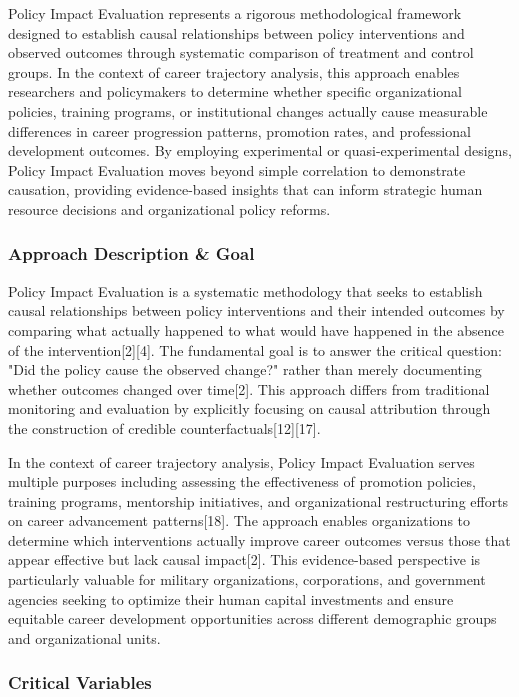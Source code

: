 \documentclass[main.tex]{subfiles}
\begin{document}
Policy Impact Evaluation represents a rigorous methodological framework designed to establish causal relationships between policy interventions and observed outcomes through systematic comparison of treatment and control groups. In the context of career trajectory analysis, this approach enables researchers and policymakers to determine whether specific organizational policies, training programs, or institutional changes actually cause measurable differences in career progression patterns, promotion rates, and professional development outcomes. By employing experimental or quasi-experimental designs, Policy Impact Evaluation moves beyond simple correlation to demonstrate causation, providing evidence-based insights that can inform strategic human resource decisions and organizational policy reforms.

\subsubsection{Approach Description \& Goal}

Policy Impact Evaluation is a systematic methodology that seeks to establish causal relationships between policy interventions and their intended outcomes by comparing what actually happened to what would have happened in the absence of the intervention[2][4]. The fundamental goal is to answer the critical question: "Did the policy cause the observed change?" rather than merely documenting whether outcomes changed over time[2]. This approach differs from traditional monitoring and evaluation by explicitly focusing on causal attribution through the construction of credible counterfactuals[12][17].

In the context of career trajectory analysis, Policy Impact Evaluation serves multiple purposes including assessing the effectiveness of promotion policies, training programs, mentorship initiatives, and organizational restructuring efforts on career advancement patterns[18]. The approach enables organizations to determine which interventions actually improve career outcomes versus those that appear effective but lack causal impact[2]. This evidence-based perspective is particularly valuable for military organizations, corporations, and government agencies seeking to optimize their human capital investments and ensure equitable career development opportunities across different demographic groups and organizational units.

\subsubsection{Critical Variables}
\end{document}
